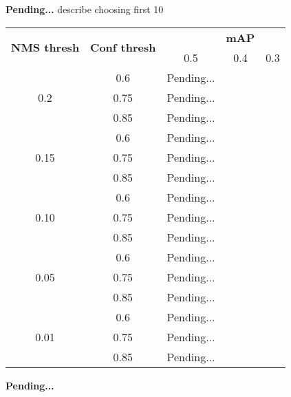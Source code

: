 \textbf{Pending...} describe choosing first 10

\begin{center}
  \begin{longtable}{|| c | c | c c c||}
    \hline
    \multirow{2}{*}{\textbf{NMS thresh}} & \multirow{2}{*}{\textbf{Conf thresh}} & {} & \textbf{mAP} & {} \\
    {} & {} & 0.5 & 0.4 & 0.3 \\
    \hline
    \multirow{3}{*}{0.2} & 0.6 & Pending... \\
    \cline{2-5}
    {} & 0.75 & Pending... \\
    \cline{2-5}
    {} & 0.85 & Pending... \\
    \hline
    \multirow{3}{*}{0.15} & 0.6 & Pending... \\
    \cline{2-5}
    {} & 0.75 & Pending... \\
    \cline{2-5}
    {} & 0.85 & Pending... \\
    \hline
    \multirow{3}{*}{0.10} & 0.6 & Pending... \\
    \cline{2-5}
    {} & 0.75 & Pending... \\
    \cline{2-5}
    {} & 0.85 & Pending... \\
    \hline
    \multirow{3}{*}{0.05} & 0.6 & Pending... \\
    \cline{2-5}
    {} & 0.75 & Pending... \\
    \cline{2-5}
    {} & 0.85 & Pending... \\
    \hline
    \multirow{3}{*}{0.01} & 0.6 & Pending... \\
    \cline{2-5}
    {} & 0.75 & Pending... \\
    \cline{2-5}
    {} & 0.85 & Pending... \\
    \hline


  \end{longtable}
\end{center}

\textbf{Pending...}

% 
